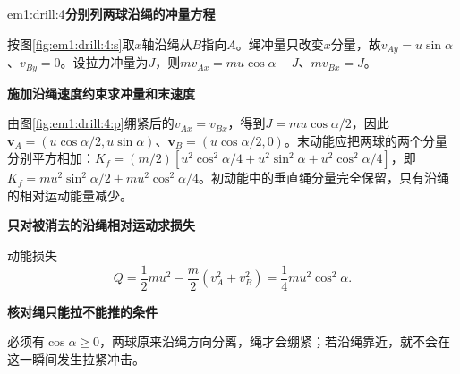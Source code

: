 \begin{drillsolution}{em1:drill:4}\textbf{分别列两球沿绳的冲量方程}\par\nobreak
按图\ref{fig:em1:drill:4:s}取$x$轴沿绳从$B$指向$A$。绳冲量只改变$x$分量，故$v_{Ay}=u\sin\alpha$、$v_{By}=0$。设拉力冲量为$J$，则$mv_{Ax}=mu\cos\alpha-J$、$mv_{Bx}=J$。



\par\medskip{}\noindent\textbf{施加沿绳速度约束求冲量和末速度}\par\nobreak
由图\ref{fig:em1:drill:4:p}绷紧后的$v_{Ax}=v_{Bx}$，得到$J=mu\cos\alpha/2$，因此$\bm v_A=(u\cos\alpha/2,u\sin\alpha)$、$\bm v_B=(u\cos\alpha/2,0)$。末动能应把两球的两个分量分别平方相加：$K_f=(m/2)[u^2\cos^2\alpha/4+u^2\sin^2\alpha+u^2\cos^2\alpha/4]$，即$K_f=mu^2\sin^2\alpha/2+mu^2\cos^2\alpha/4$。初动能中的垂直绳分量完全保留，只有沿绳的相对运动能量减少。



\par\medskip{}\noindent\textbf{只对被消去的沿绳相对运动求损失}\par\nobreak
动能损失
\[\boxed{Q=\frac12mu^2-\frac m2(v_A^2+v_B^2)=\frac14mu^2\cos^2\alpha}.\]


\par\medskip{}\noindent\textbf{核对绳只能拉不能推的条件}\par\nobreak
必须有$\cos\alpha\ge0$，两球原来沿绳方向分离，绳才会绷紧；若沿绳靠近，就不会在这一瞬间发生拉紧冲击。\end{drillsolution}
